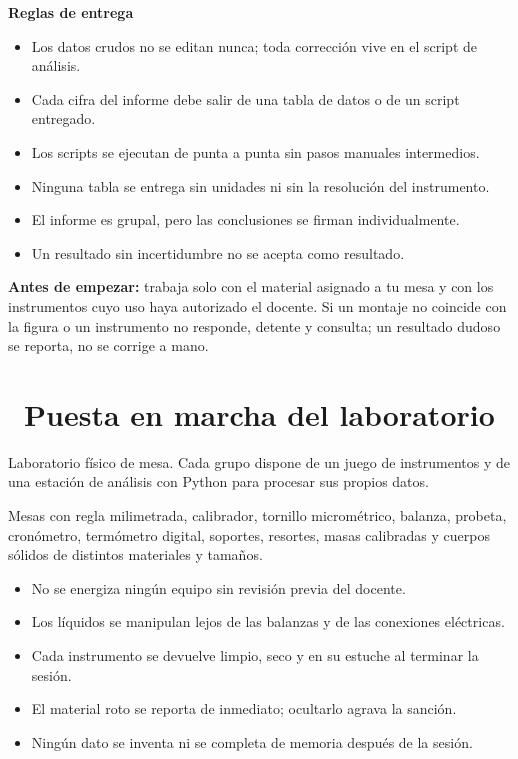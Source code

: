 \documentclass[11pt,a4paper]{article}
\newcommand{\iconotexto}[2]{\textcolor{cyanNeon}{\faIcon{#1}}~#2}
\begin{document}
\textbf{Reglas de entrega}

\begin{itemize}[leftmargin=1.4em,itemsep=2pt,topsep=3pt]
  \item Los datos crudos no se editan nunca; toda corrección vive en el script de análisis.
  \item Cada cifra del informe debe salir de una tabla de datos o de un script entregado.
  \item Los scripts se ejecutan de punta a punta sin pasos manuales intermedios.
  \item Ninguna tabla se entrega sin unidades ni sin la resolución del instrumento.
  \item El informe es grupal, pero las conclusiones se firman individualmente.
  \item Un resultado sin incertidumbre no se acepta como resultado.
\end{itemize}

\begin{tcolorbox}[cajaMejora]\textbf{Antes de empezar:} trabaja solo con el material asignado a tu mesa y con los instrumentos cuyo uso haya autorizado el docente. Si un montaje no coincide con la figura o un instrumento no responde, detente y consulta; un resultado dudoso se reporta, no se corrige a mano.
\end{tcolorbox}

\section{\iconotexto{cube}{Puesta en marcha del laboratorio}}

Laboratorio físico de mesa. Cada grupo dispone de un juego de instrumentos y de una estación de análisis con Python para procesar sus propios datos.

Mesas con regla milimetrada, calibrador, tornillo micrométrico, balanza, probeta, cronómetro, termómetro digital, soportes, resortes, masas calibradas y cuerpos sólidos de distintos materiales y tamaños.

\begin{itemize}[leftmargin=1.4em,itemsep=2pt,topsep=3pt]
  \item No se energiza ningún equipo sin revisión previa del docente.
  \item Los líquidos se manipulan lejos de las balanzas y de las conexiones eléctricas.
  \item Cada instrumento se devuelve limpio, seco y en su estuche al terminar la sesión.
  \item El material roto se reporta de inmediato; ocultarlo agrava la sanción.
  \item Ningún dato se inventa ni se completa de memoria después de la sesión.
\end{itemize}
\end{document}
